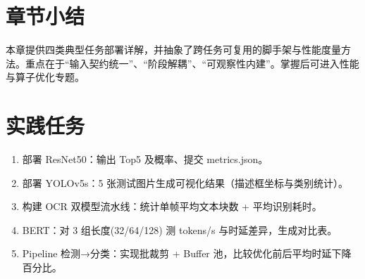 \section{章节小结}\label{ux7ae0ux8282ux5c0fux7ed3}

本章提供四类典型任务部署详解，并抽象了跨任务可复用的脚手架与性能度量方法。重点在于``输入契约统一''、``阶段解耦''、``可观察性内建''。掌握后可进入性能与算子优化专题。

\section{实践任务}\label{ux5b9eux8df5ux4efbux52a1}

\begin{enumerate}
\def\labelenumi{\arabic{enumi}.}
\tightlist
\item
  部署 ResNet50：输出 Top5 及概率、提交 metrics.json。
\item
  部署 YOLOv5s：5 张测试图片生成可视化结果（描述框坐标与类别统计）。
\item
  构建 OCR 双模型流水线：统计单帧平均文本块数 + 平均识别耗时。
\item
  BERT：对 3 组长度(32/64/128) 测 tokens/s 与时延差异，生成对比表。
\item
  Pipeline 检测→分类：实现批裁剪 + Buffer
  池，比较优化前后平均时延下降百分比。
\end{enumerate}
